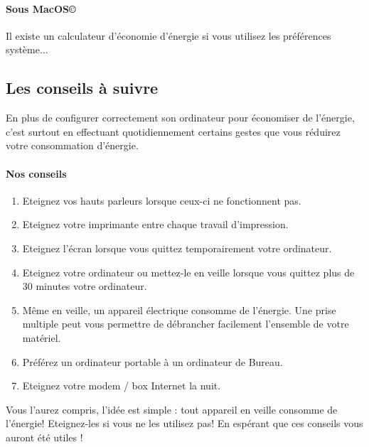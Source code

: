 \documentclass[a4paper,11pt,french]{article}
\begin{document}
\paragraph{Sous MacOS\copyright}
Il existe un calculateur d'économie d'énergie si vous utilisez les préférences système...



\subsection{Les conseils à suivre}
En plus de configurer correctement son ordinateur pour économiser de l'énergie, c'est surtout en effectuant quotidiennement certains gestes que vous réduirez votre consommation d'énergie.\\

\paragraph{Nos conseils}
\begin{enumerate}
\item Eteignez vos hauts parleurs lorsque ceux-ci ne fonctionnent pas.
\item Eteignez votre imprimante entre chaque travail d'impression.
\item Eteignez l'écran lorsque vous quittez temporairement votre ordinateur.
\item Eteignez votre ordinateur ou mettez-le en veille lorsque vous quittez plus de 30 minutes votre ordinateur.
\item Même en veille, un appareil électrique consomme de l'énergie. Une prise multiple peut vous permettre de débrancher facilement l'ensemble de votre matériel.
\item Préférez un ordinateur portable à un ordinateur de Bureau.
\item Eteignez votre modem / box Internet la nuit.
\end{enumerate}

Vous l'aurez compris, l'idée est simple : tout appareil en veille consomme de l'énergie! Eteignez-les si vous ne les utilisez pas!
En espérant que ces conseils vous auront été utiles !
\end{document}
